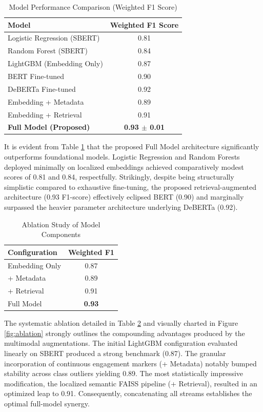 \documentclass[11pt]{article}
\begin{document}
\begin{table}[H]
\centering
\caption{Model Performance Comparison (Weighted F1 Score)}
\begin{tabular}{lc}
\toprule
Model & Weighted F1 Score \\
\midrule
Logistic Regression (SBERT) & 0.81 \\
Random Forest (SBERT) & 0.84 \\
LightGBM (Embedding Only) & 0.87 \\
BERT Fine-tuned & 0.90 \\
DeBERTa Fine-tuned & 0.92 \\
\midrule
Embedding + Metadata & 0.89 \\
Embedding + Retrieval & 0.91 \\
\textbf{Full Model (Proposed)} & \textbf{0.93 $\pm$ 0.01} \\
\bottomrule
\end{tabular}
\label{tab:results}
\end{table}

It is evident from Table \ref{tab:results} that the proposed Full Model architecture significantly outperforms foundational models. Logistic Regression and Random Forests deployed minimally on localized embeddings achieved comparatively modest scores of 0.81 and 0.84, respectfully. Strikingly, despite being structurally simplistic compared to exhaustive fine-tuning, the proposed retrieval-augmented architecture (0.93 F1-score) effectively eclipsed BERT (0.90) and marginally surpassed the heavier parameter architecture underlying DeBERTa (0.92). 

\begin{table}[H]
\centering
\caption{Ablation Study of Model Components}
\begin{tabular}{lc}
\toprule
Configuration & Weighted F1 \\
\midrule
Embedding Only & 0.87 \\
+ Metadata & 0.89 \\
+ Retrieval & 0.91 \\
Full Model & \textbf{0.93} \\
\bottomrule
\end{tabular}
\label{tab:ablation}
\end{table}

The systematic ablation detailed in Table \ref{tab:ablation} and visually charted in Figure \ref{fig:ablation} strongly outlines the compounding advantages produced by the multimodal augmentations. The initial LightGBM configuration evaluated linearly on SBERT produced a strong benchmark (0.87). The granular incorporation of continuous engagement markers (+ Metadata) notably bumped stability across class outliers yielding 0.89. The most statistically impressive modification, the localized semantic FAISS pipeline (+ Retrieval), resulted in an optimized leap to 0.91. Consequently, concatenating all streams establishes the optimal full-model synergy. 
\end{document}
